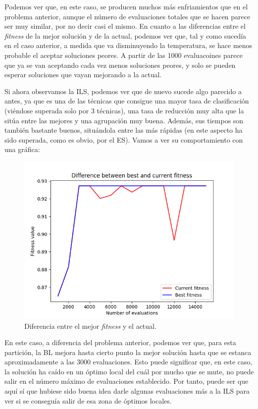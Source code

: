 \documentclass[11pt,a4paper]{article}
\begin{document}
Podemos ver que, en este caso, se producen muchos más enfriamientos que en el problema anterior, aunque el número de evaluaciones
totales que se hacen parece ser muy similar, por no decir casi el mismo. En cuanto a las diferencias entre el \textit{fitness}
de la mejor solución y de la actual, podemos ver que, tal y como sucedía en el caso anterior, a medida que va disminuyendo la
temperatura, se hace menos probable el aceptar soluciones peores. A partir de las 1000 evaluacoines parece que ya se
van aceptando cada vez menos soluciones peores, y solo se pueden esperar soluciones que vayan mejorando a la actual.

Si ahora observamos la ILS, podemos ver que de nuevo sucede algo parecido a antes, ya que es una de las técnicas que consigue
una mayor tasa de clasificación (viéndose superada solo por 3 técnicas), una tasa de reducción muy alta que la sitúa entre
las mejores y una agrupación muy buena. Además, sus tiempos son también bastante buenos, situándola entre las más rápidas (en
este aspecto ha sido superada, como es obvio, por el ES). Vamos a ver su comportamiento con una gráfica:

\begin{figure}[H]
\centering
\includegraphics[scale=0.4]{img/ionosphere-ils.png}
\caption{Diferencia entre el mejor \textit{fitness} y el actual.}
\end{figure}

En este caso, a diferencia del problema anterior, podemos ver que, para esta partición, la BL mejora hasta cierto punto la
mejor solución hasta que se estanca aproximadamente a las 3000 evaluaciones. Esto puede significar que, en este caso, la
solución ha caído en un óptimo local del cuál por mucho que se mute, no puede salir en el número máximo de evaluaciones establecido.
Por tanto, puede ser que aquí sí que hubiese sido buena idea darle algunas evaluaciones más a la ILS para ver si se conseguía salir
de esa zona de óptimos locales.
\end{document}
